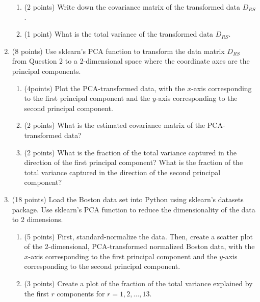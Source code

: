 \documentclass[11pt]{article}
\begin{document}
\begin{enumerate}
\begin{enumerate}
        \item (2 points) Write down the covariance matrix of the transformed
        data $D_{RS}$.

        \item (1 point) What is the total variance of the transformed data
        $D_{RS}$.

    \end{enumerate}

    \item (8 points) Use sklearn’s PCA function to transform the data matrix
    $D_{RS}$ from Question 2 to a 2-dimensional space where the coordinate axes
    are the principal components.

    \begin{enumerate}

        \item (4points) Plot the PCA-transformed data, with the $x$-axis
        corresponding to the first principal component and the $y$-axis
        corresponding to the second principal component.

        \item (2 points) What is the estimated covariance matrix of the
        PCA-transformed data?

        \item (2 points) What is the fraction of the total variance captured in
        the direction of the first principal component? What is the fraction of
        the total variance captured in the direction of the second principal
        component?

    \end{enumerate}

    \item (18 points) Load the Boston data set into Python using sklearn's
    datasets package. Use sklearn's PCA function to reduce the dimensionality of
    the data to 2 dimensions.

    \begin{enumerate}

        \item (5 points) First, standard-normalize the data. Then, create a
        scatter plot of the 2-dimensional, PCA-transformed normalized Boston
        data, with the $x$-axis corresponding to the first principal component
        and the $y$-axis corresponding to the second principal component.
        \label{item:4.1}

        \item (3 points) Create a plot of the fraction of the total variance
        explained by the first $r$ components for $r = 1, 2, \ldots, 13$.


\end{enumerate}
\end{enumerate}
\end{document}
